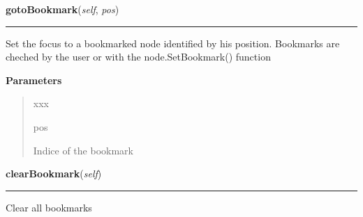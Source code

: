     \label{tracetool:WinTrace:gotoBookmark}

    \vspace{0.5ex}

\hspace{.8\funcindent}\begin{boxedminipage}{\funcwidth}

    \raggedright \textbf{gotoBookmark}(\textit{self}, \textit{pos})

    \vspace{-1.5ex}

    \rule{\textwidth}{0.5\fboxrule}
\setlength{\parskip}{2ex}
    Set the focus to a bookmarked node identified by his position. 
    Bookmarks are cheched by the user or with the node.SetBookmark() 
    function

\setlength{\parskip}{1ex}
      \textbf{Parameters}
      \vspace{-1ex}

      \begin{quote}
        \begin{Ventry}{xxx}

          \item[pos]

          Indice of the bookmark

        \end{Ventry}

      \end{quote}

    \end{boxedminipage}

    \label{tracetool:WinTrace:clearBookmark}

    \vspace{0.5ex}

\hspace{.8\funcindent}\begin{boxedminipage}{\funcwidth}

    \raggedright \textbf{clearBookmark}(\textit{self})

    \vspace{-1.5ex}

    \rule{\textwidth}{0.5\fboxrule}
\setlength{\parskip}{2ex}
    Clear all bookmarks

\setlength{\parskip}{1ex}
    \end{boxedminipage}

